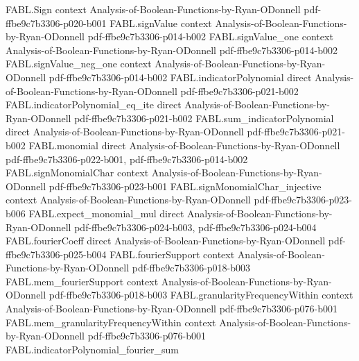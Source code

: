 \begin{theorem}
\label{FABL.sum_sq_fourierCoeff_eq_one}
\leanok
{}
\proofstep
  {FABL.Sign}
  {context}
  {Analysis-of-Boolean-Functions-by-Ryan-ODonnell}
  {pdf-ffbe9c7b3306-p020-b001}
\proofstep
  {FABL.signValue}
  {context}
  {Analysis-of-Boolean-Functions-by-Ryan-ODonnell}
  {pdf-ffbe9c7b3306-p014-b002}
\proofstep
  {FABL.signValue_one}
  {context}
  {Analysis-of-Boolean-Functions-by-Ryan-ODonnell}
  {pdf-ffbe9c7b3306-p014-b002}
\proofstep
  {FABL.signValue_neg_one}
  {context}
  {Analysis-of-Boolean-Functions-by-Ryan-ODonnell}
  {pdf-ffbe9c7b3306-p014-b002}
\proofstep
  {FABL.indicatorPolynomial}
  {direct}
  {Analysis-of-Boolean-Functions-by-Ryan-ODonnell}
  {pdf-ffbe9c7b3306-p021-b002}
\proofstep
  {FABL.indicatorPolynomial_eq_ite}
  {direct}
  {Analysis-of-Boolean-Functions-by-Ryan-ODonnell}
  {pdf-ffbe9c7b3306-p021-b002}
\proofstep
  {FABL.sum_indicatorPolynomial}
  {direct}
  {Analysis-of-Boolean-Functions-by-Ryan-ODonnell}
  {pdf-ffbe9c7b3306-p021-b002}
\proofstep
  {FABL.monomial}
  {direct}
  {Analysis-of-Boolean-Functions-by-Ryan-ODonnell}
  {pdf-ffbe9c7b3306-p022-b001,
    pdf-ffbe9c7b3306-p014-b002}
\proofstep
  {FABL.signMonomialChar}
  {context}
  {Analysis-of-Boolean-Functions-by-Ryan-ODonnell}
  {pdf-ffbe9c7b3306-p023-b001}
\proofstep
  {FABL.signMonomialChar_injective}
  {context}
  {Analysis-of-Boolean-Functions-by-Ryan-ODonnell}
  {pdf-ffbe9c7b3306-p023-b006}
\proofstep
  {FABL.expect_monomial_mul}
  {direct}
  {Analysis-of-Boolean-Functions-by-Ryan-ODonnell}
  {pdf-ffbe9c7b3306-p024-b003,
    pdf-ffbe9c7b3306-p024-b004}
\proofstep
  {FABL.fourierCoeff}
  {direct}
  {Analysis-of-Boolean-Functions-by-Ryan-ODonnell}
  {pdf-ffbe9c7b3306-p025-b004}
\proofstep
  {FABL.fourierSupport}
  {context}
  {Analysis-of-Boolean-Functions-by-Ryan-ODonnell}
  {pdf-ffbe9c7b3306-p018-b003}
\proofstep
  {FABL.mem_fourierSupport}
  {context}
  {Analysis-of-Boolean-Functions-by-Ryan-ODonnell}
  {pdf-ffbe9c7b3306-p018-b003}
\proofstep
  {FABL.granularityFrequencyWithin}
  {context}
  {Analysis-of-Boolean-Functions-by-Ryan-ODonnell}
  {pdf-ffbe9c7b3306-p076-b001}
\proofstep
  {FABL.mem_granularityFrequencyWithin}
  {context}
  {Analysis-of-Boolean-Functions-by-Ryan-ODonnell}
  {pdf-ffbe9c7b3306-p076-b001}
\proofstep
  {FABL.indicatorPolynomial_fourier_sum}

\end{theorem}
